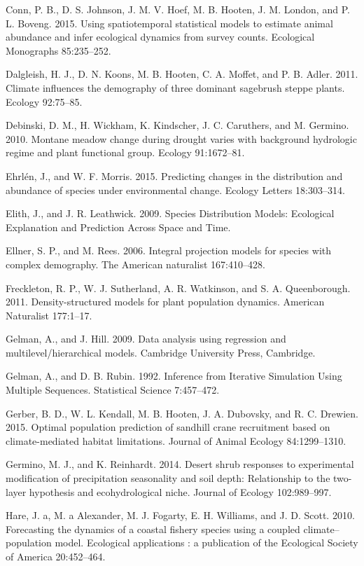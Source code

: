 \documentclass[12pt,]{article}
\begin{document}
Conn, P. B., D. S. Johnson, J. M. V. Hoef, M. B. Hooten, J. M. London,
and P. L. Boveng. 2015. Using spatiotemporal statistical models to
estimate animal abundance and infer ecological dynamics from survey
counts. Ecological Monographs 85:235--252.

Dalgleish, H. J., D. N. Koons, M. B. Hooten, C. A. Moffet, and P. B.
Adler. 2011. Climate influences the demography of three dominant
sagebrush steppe plants. Ecology 92:75--85.

Debinski, D. M., H. Wickham, K. Kindscher, J. C. Caruthers, and M.
Germino. 2010. Montane meadow change during drought varies with
background hydrologic regime and plant functional group. Ecology
91:1672--81.

Ehrl{é}n, J., and W. F. Morris. 2015. Predicting changes in the
distribution and abundance of species under environmental change.
Ecology Letters 18:303--314.

Elith, J., and J. R. Leathwick. 2009. Species Distribution Models:
Ecological Explanation and Prediction Across Space and Time.

Ellner, S. P., and M. Rees. 2006. Integral projection models for species
with complex demography. The American naturalist 167:410--428.

Freckleton, R. P., W. J. Sutherland, A. R. Watkinson, and S. A.
Queenborough. 2011. Density-structured models for plant population
dynamics. American Naturalist 177:1--17.

Gelman, A., and J. Hill. 2009. Data analysis using regression and
multilevel/hierarchical models. Cambridge University Press, Cambridge.

Gelman, A., and D. B. Rubin. 1992. Inference from Iterative Simulation
Using Multiple Sequences. Statistical Science 7:457--472.

Gerber, B. D., W. L. Kendall, M. B. Hooten, J. A. Dubovsky, and R. C.
Drewien. 2015. Optimal population prediction of sandhill crane
recruitment based on climate-mediated habitat limitations. Journal of
Animal Ecology 84:1299--1310.

Germino, M. J., and K. Reinhardt. 2014. Desert shrub responses to
experimental modification of precipitation seasonality and soil depth:
Relationship to the two-layer hypothesis and ecohydrological niche.
Journal of Ecology 102:989--997.

Hare, J. a, M. a Alexander, M. J. Fogarty, E. H. Williams, and J. D.
Scott. 2010. Forecasting the dynamics of a coastal fishery species using
a coupled climate--population model. Ecological applications : a
publication of the Ecological Society of America 20:452--464.
\end{document}
